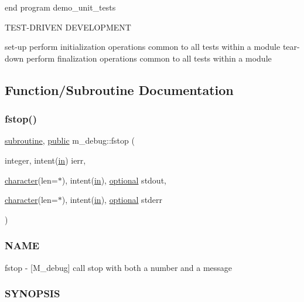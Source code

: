 end program demo\+\_\+unit\+\_\+tests

T\+E\+S\+T-\/\+D\+R\+I\+V\+EN D\+E\+V\+E\+L\+O\+P\+M\+E\+NT

set-\/up perform initialization operations common to all tests within a module tear-\/down perform finalization operations common to all tests within a module 

\subsection{Function/\+Subroutine Documentation}
\mbox{\label{namespacem__debug_a66fa03a6a97837acc4c1265be1294295}} 
\subsubsection{\texorpdfstring{fstop()}{fstop()}}
{\footnotesize\ttfamily \hyperlink{M__stopwatch_83_8txt_acfbcff50169d691ff02d4a123ed70482}{subroutine}, \hyperlink{M__stopwatch_83_8txt_a2f74811300c361e53b430611a7d1769f}{public} m\+\_\+debug\+::fstop (\begin{DoxyParamCaption}\item[{integer, intent(\hyperlink{M__journal_83_8txt_afce72651d1eed785a2132bee863b2f38}{in})}]{ierr,  }\item[{\hyperlink{option__stopwatch_83_8txt_abd4b21fbbd175834027b5224bfe97e66}{character}(len=$\ast$), intent(\hyperlink{M__journal_83_8txt_afce72651d1eed785a2132bee863b2f38}{in}), \hyperlink{option__stopwatch_83_8txt_aa4ece75e7acf58a4843f70fe18c3ade5}{optional}}]{stdout,  }\item[{\hyperlink{option__stopwatch_83_8txt_abd4b21fbbd175834027b5224bfe97e66}{character}(len=$\ast$), intent(\hyperlink{M__journal_83_8txt_afce72651d1eed785a2132bee863b2f38}{in}), \hyperlink{option__stopwatch_83_8txt_aa4ece75e7acf58a4843f70fe18c3ade5}{optional}}]{stderr }\end{DoxyParamCaption})}



\subsubsection*{N\+A\+ME}

fstop -\/ \mbox{[}M\+\_\+debug\mbox{]} call stop with both a number and a message \subsubsection*{S\+Y\+N\+O\+P\+S\+IS}

